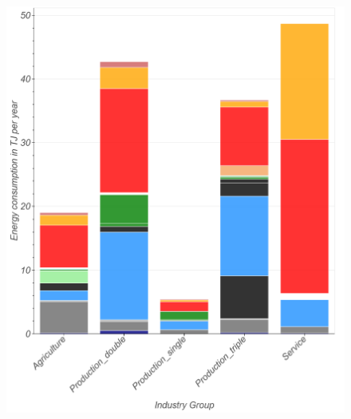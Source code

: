 \documentclass[review]{elsarticle}
\begin{document}
\begin{figure}
\centering
\begin{minipage}{.5\textwidth}
  \centering
  \includegraphics[width=\linewidth]{Img/dan_ind/overview_total.png}
\end{minipage}%
\begin{minipage}{.3\textwidth}
  \centering

\end{minipage}
\end{figure}
\end{document}
